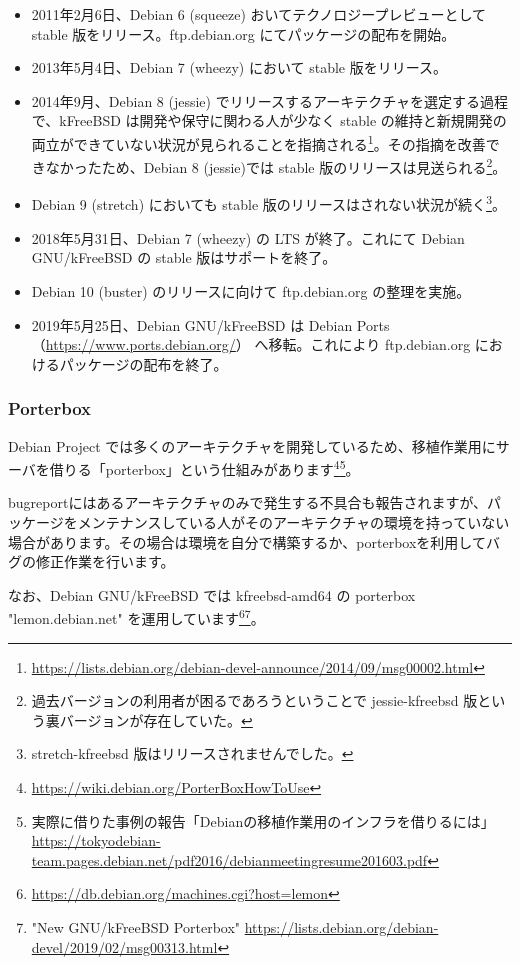 \documentclass[mingoth,a4paper]{jsarticle}
\begin{document}
\begin{itemize}
\item 2011年2月6日、Debian 6 (squeeze) おいてテクノロジープレビューとして stable 版をリリース。ftp.debian.org にてパッケージの配布を開始。
\item 2013年5月4日、Debian 7 (wheezy) において stable 版をリリース。
\item 2014年9月、Debian 8 (jessie) でリリースするアーキテクチャを選定する過程で、kFreeBSD は開発や保守に関わる人が少なく stable の維持と新規開発の両立ができていない状況が見られることを指摘される\footnote{\url{https://lists.debian.org/debian-devel-announce/2014/09/msg00002.html}}。その指摘を改善できなかったため、Debian 8 (jessie)では stable 版のリリースは見送られる\footnote{過去バージョンの利用者が困るであろうということで jessie-kfreebsd 版という裏バージョンが存在していた。}。
\item Debian 9 (stretch) においても stable 版のリリースはされない状況が続く\footnote{stretch-kfreebsd 版はリリースされませんでした。}。
\item 2018年5月31日、Debian 7 (wheezy) の LTS が終了。これにて Debian GNU/kFreeBSD の stable 版はサポートを終了。
\item Debian 10 (buster) のリリースに向けて ftp.debian.org の整理を実施。
\item 2019年5月25日、Debian GNU/kFreeBSD は Debian Ports（\url{https://www.ports.debian.org/}） へ移転。これにより ftp.debian.org におけるパッケージの配布を終了。
\end{itemize}

\subsubsection{Porterbox}

Debian Project では多くのアーキテクチャを開発しているため、移植作業用にサーバを借りる「porterbox」という仕組みがあります\footnote{\url{https://wiki.debian.org/PorterBoxHowToUse}}\footnote{実際に借りた事例の報告「Debianの移植作業用のインフラを借りるには」\url{https://tokyodebian-team.pages.debian.net/pdf2016/debianmeetingresume201603.pdf}}。

bugreportにはあるアーキテクチャのみで発生する不具合も報告されますが、パッケージをメンテナンスしている人がそのアーキテクチャの環境を持っていない場合があります。その場合は環境を自分で構築するか、porterboxを利用してバグの修正作業を行います。

なお、Debian GNU/kFreeBSD では kfreebsd-amd64 の porterbox "lemon.debian.net" を運用しています\footnote{\url{https://db.debian.org/machines.cgi?host=lemon}}\footnote{"New GNU/kFreeBSD Porterbox" \url{https://lists.debian.org/debian-devel/2019/02/msg00313.html}}。
\end{document}
